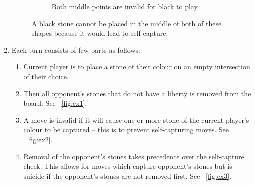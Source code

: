 \documentclass{l4proj}
\begin{document}
\begin{enumerate}
\begin{figure}[!ht]
\begin{subfigure}[t]{0.375\textwidth}
  \caption{Both middle points are invalid for black to play}
  \label{fig:ex2-1}
  \end{subfigure}
  \caption{A black stone cannot be placed in the middle of both of these shapes because it would lead to self-capture.}
  \label{fig:ex2}
  \end{figure}

  \item Each turn consists of few parts as follows:
  	\begin{enumerate}[label={(\alph*)}]
		\item Current player is to place a stone of their colour on an empty intersection of their choice.
		\item Then all opponent’s stones that do not have a liberty is removed from the board. See ~\autoref{fig:ex1}.
		\item A move is invalid if it will cause one or more stone of the current player’s colour to be captured – this is to prevent self-capturing moves. See ~\autoref{fig:ex2}.
		\item Removal of the opponent’s stones takes precedence over the self-capture check. This allows for moves which capture opponent’s stones but is suicide if the opponent’s stones are not removed first. See ~\autoref{fig:ex3}.
	\end{enumerate}


\end{enumerate}
\end{document}
